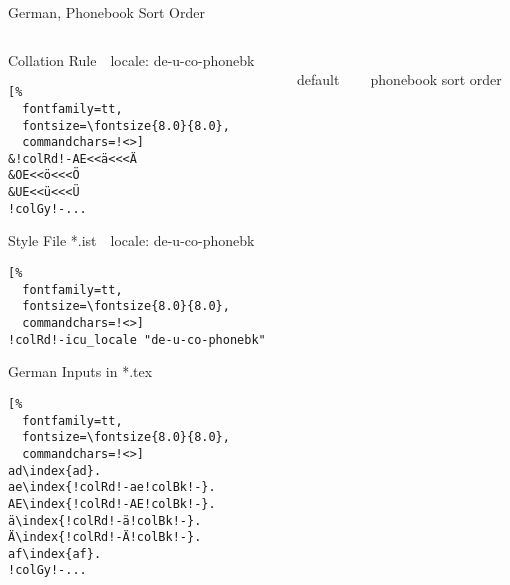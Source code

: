 \documentclass[aspectratio=169,10pt]{beamer}
\begin{document}
\setmonofont{Noto Sans Mono}
\begin{frame}[fragile]{German, Phonebook Sort Order}

\begin{columns}
\begin{column}{55mm}

\setmonofont{Noto Sans Mono}
\begin{block}{Collation Rule~~\scriptsize locale: de-u-co-phonebk}
\begin{Verbatim}[%
  fontfamily=tt,
  fontsize=\fontsize{8.0}{8.0},
  commandchars=!<>]
&!colRd!-AE<<ä<<<Ä
&OE<<ö<<<Ö
&UE<<ü<<<Ü
!colGy!-...
\end{Verbatim}
\end{block}
\begin{exampleblock}{Style File *.ist~~\scriptsize locale: de-u-co-phonebk}
\begin{Verbatim}[%
  fontfamily=tt,
  fontsize=\fontsize{8.0}{8.0},
  commandchars=!<>]
!colRd!-icu_locale "de-u-co-phonebk"
\end{Verbatim}
\end{exampleblock}
\begin{exampleblock}{German Inputs in *.tex}
\begin{Verbatim}[%
  fontfamily=tt,
  fontsize=\fontsize{8.0}{8.0},
  commandchars=!<>]
ad\index{ad}.
ae\index{!colRd!-ae!colBk!-}.
AE\index{!colRd!-AE!colBk!-}.
ä\index{!colRd!-ä!colBk!-}.
Ä\index{!colRd!-Ä!colBk!-}.
af\index{af}.
!colGy!-...
\end{Verbatim}
\end{exampleblock}
\end{column}

\begin{column}{38mm}
\begin{center}
\\[2mm]%
default
\end{center}
\end{column}

\begin{column}{38mm}
\begin{center}
\\[2mm]%
phonebook sort order
\end{center}
\end{column}
\end{columns}

\end{frame}
\end{document}

